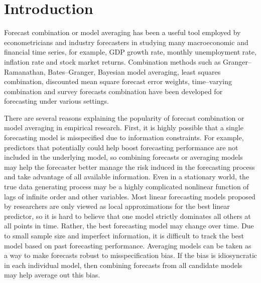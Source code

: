 \section{Introduction}
Forecast combination or model averaging has been a useful tool employed by econometricians and industry forecasters in studying many macroeconomic and financial time series, for example, GDP growth rate, monthly unemployment rate, inflation rate and stock market returns. Combination methods such as Granger--Ramanathan, Bates--Granger, Bayesian model averaging, least squares combination, discounted mean square forecast error weights, time--varying combination and survey forecasts combination have been developed for forecasting under various settings. 

There are several reasons explaining the popularity of forecast combination or model averaging in empirical research. First, it is highly possible that a single forecasting model is misspecified due to information constraints. For example, predictors that potentially could help boost forecasting performance are not included in the underlying model, so combining forecasts or averaging models may help the forecaster better manage the risk induced in the forecasting process and take advantage of all available information. Even in a stationary world, the true data generating process may be a highly complicated nonlinear function of lags of infinite order and other variables. Most linear forecasting models proposed by researchers are only viewed as local approximations for the best linear predictor, so it is hard to believe that one model strictly dominates all others at all points in time. Rather, the best forecasting model may change over time. Due to small sample size and imperfect information, it is difficult to track the best model based on past forecasting performance. Averaging models can be taken as a way to make forecasts robust to misspecification bias. If the bias is idiosyncratic in each individual model, then combining forecasts from all candidate models may help average out this bias. 

